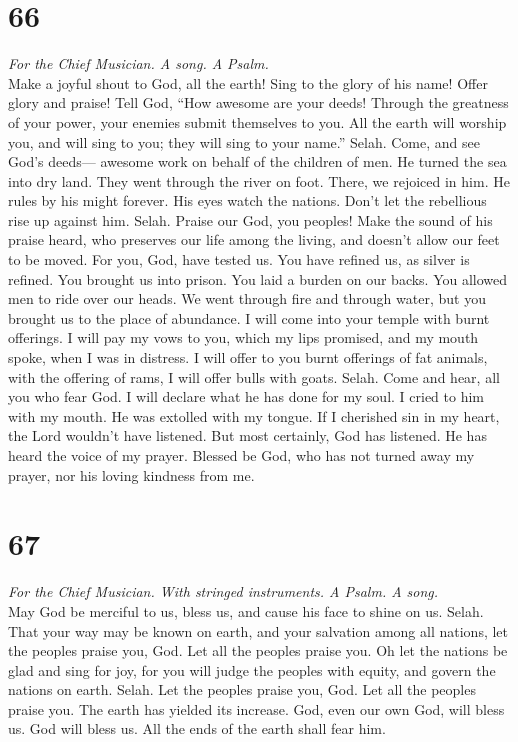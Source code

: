 \hypertarget{section-65}{%
\section{66}\label{section-65}}

\emph{For the Chief Musician. A song. A Psalm.}\\
 Make a joyful shout to God, all the earth! 
Sing to the glory of his name! Offer glory and praise! 
Tell God, ``How awesome are your deeds! Through the greatness of your
power, your enemies submit themselves to you.  All the
earth will worship you, and will sing to you; they will sing to your
name.'' Selah.  Come, and see God's deeds--- awesome work
on behalf of the children of men.  He turned the sea into
dry land. They went through the river on foot. There, we rejoiced in
him.  He rules by his might forever. His eyes watch the
nations. Don't let the rebellious rise up against him. Selah.
 Praise our God, you peoples! Make the sound of his praise
heard,  who preserves our life among the living, and
doesn't allow our feet to be moved.  For you, God, have
tested us. You have refined us, as silver is refined. 
You brought us into prison. You laid a burden on our backs.
 You allowed men to ride over our heads. We went through
fire and through water, but you brought us to the place of abundance.
 I will come into your temple with burnt offerings. I
will pay my vows to you,  which my lips promised, and my
mouth spoke, when I was in distress.  I will offer to you
burnt offerings of fat animals, with the offering of rams, I will offer
bulls with goats. Selah.  Come and hear, all you who fear
God. I will declare what he has done for my soul.  I
cried to him with my mouth. He was extolled with my tongue.
 If I cherished sin in my heart, the Lord wouldn't have
listened.  But most certainly, God has listened. He has
heard the voice of my prayer.  Blessed be God, who has
not turned away my prayer, nor his loving kindness from me.

\hypertarget{section-66}{%
\section{67}\label{section-66}}

\emph{For the Chief Musician. With stringed instruments. A Psalm. A
song.}\\
 May God be merciful to us, bless us, and cause his face
to shine on us. Selah.  That your way may be known on
earth, and your salvation among all nations,  let the
peoples praise you, God. Let all the peoples praise you. 
Oh let the nations be glad and sing for joy, for you will judge the
peoples with equity, and govern the nations on earth. Selah.
 Let the peoples praise you, God. Let all the peoples
praise you.  The earth has yielded its increase. God, even
our own God, will bless us.  God will bless us. All the
ends of the earth shall fear him.

